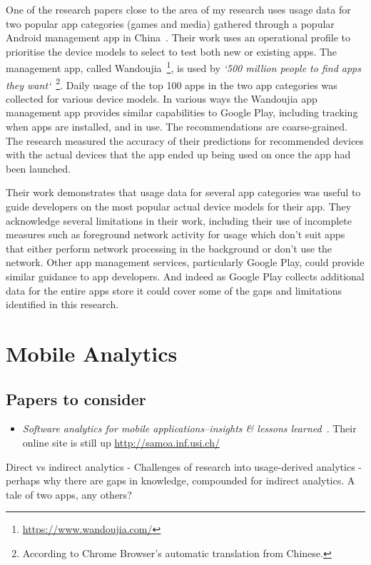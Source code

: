 One of the research papers close to the area of my research uses usage data for two popular app categories (games and media) gathered through a popular Android management app in China~\citep{lu2016_PRADA}. Their work uses an operational profile to prioritise the device models to select to test both new or existing apps. The management app, called Wandoujia~\footnote{\url{https://www.wandoujia.com/}}, is used by \emph{`500 million people to find apps they want`}~\footnote{According to Chrome Browser's automatic translation from Chinese.}. Daily usage of the top 100 apps in the two app categories was collected for various device models. In various ways the Wandoujia app management app provides similar capabilities to Google Play, including tracking when apps are installed, and in use. The recommendations are coarse-grained. The research measured the accuracy of their predictions for recommended devices with the actual devices that the app ended up being used on once the app had been launched. 

Their work demonstrates that usage data for several app categories was useful to guide developers on the most popular actual device models for their app. They acknowledge several limitations in their work, including their use of incomplete measures such as foreground network activity for usage which don't suit apps that either perform network processing in the background or don't use the network. Other app management services, particularly Google Play, could provide similar guidance to app developers. And indeed as Google Play collects additional data for the entire apps store it could cover some of the gaps and limitations identified in this research.


\hypertarget{mobile.analytics}{}
\section{Mobile Analytics}

\subsection{Papers to consider}
\begin{itemize}
    \item \emph{Software analytics for mobile applications--insights \& lessons learned}~\citep{minelli2013_software_analytics_samoa}. Their online site is still up \url{http://samoa.inf.usi.ch/}
\end{itemize}

Direct vs indirect analytics - 
Challenges of research into usage-derived analytics - perhaps why there are gaps in knowledge, compounded for indirect analytics. A tale of two apps, any others?

